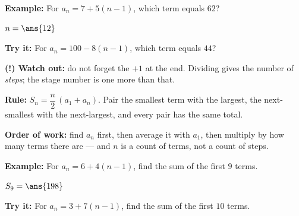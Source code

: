 \documentclass[12pt]{article}
\begin{document}
\begin{examplebox}
\textbf{Example:} \quad For $a_n = 7 + 5(n-1)$, which term equals $62$?

$n = \ans{12}$
\end{examplebox}

\begin{tryitbox}
\textbf{Try it:} \quad For $a_n = 100 - 8(n-1)$, which term equals $44$?\\[2pt]
\end{tryitbox}

\begin{watchoutbox}
\textbf{(!) Watch out:} do not forget the $+1$ at the end. Dividing gives the number of \emph{steps}; the stage number is one more than that.
\end{watchoutbox}


\begin{formulabox}
\textbf{Rule:} $S_n = \dfrac{n}{2}\,(a_1 + a_n)$. Pair the smallest term with the largest, the next-smallest with the next-largest, and every pair has the same total.\par
\textbf{Order of work:} find $a_n$ first, then average it with $a_1$, then multiply by how many terms there are --- and $n$ is a count of terms, not a count of steps.
\end{formulabox}

\begin{examplebox}
\textbf{Example:} \quad For $a_n = 6 + 4(n-1)$, find the sum of the first $9$ terms.

$S_9 = \ans{198}$
\end{examplebox}

\begin{tryitbox}
\textbf{Try it:} \quad For $a_n = 3 + 7(n-1)$, find the sum of the first $10$ terms.\\[2pt]
\end{tryitbox}
\end{document}
